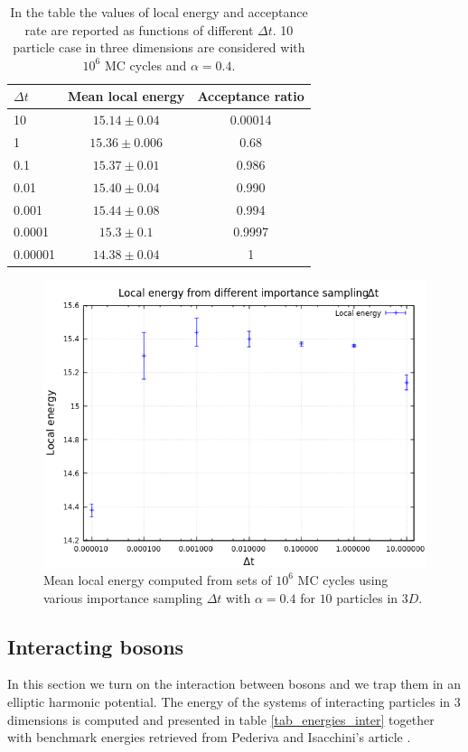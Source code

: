 \begin{table}[H]
\caption{In the table the values of local energy and acceptance rate are reported as functions of different $\Delta t$. 10 particle case in three dimensions are considered with $10^6$ MC cycles and $\alpha =0.4$.}
\centering
\begin{tabular}{l |c |c  } 
\textbf{$\Delta t$}& \textbf{Mean local energy} & \textbf{Acceptance ratio} \\ \hline
10 & $15.14\pm 0.04$   & 0.00014   \\
1 &  $15.36\pm0.006$   & 0.68  \\
0.1 & $15.37\pm0.01$    &  0.986 \\
0.01 & $15.40 \pm0.04 $  &  0.990 \\
0.001 & $15.44\pm0.08$    &  0.994 \\
0.0001 & $15.3\pm0.1$    &  0.9997 \\
0.00001 & $14.38\pm0.04$    &  1 \\
 
\end{tabular}
\label{tab_imp_acc}
\end{table} 


\begin{figure}[H]
\centering
\includegraphics[scale=1]{figures/importance_sampling_dt_new}
\caption{Mean local energy computed from sets of $10^6$ MC cycles using various importance sampling $\Delta t$ with $\alpha = 0.4$ for $10$ particles in $3D$. }
\label{fig_energy_timestep}
\end{figure}

\subsection{Interacting bosons}
In this section we turn on the interaction between bosons and we trap them in an elliptic harmonic potential. The energy of the systems of interacting particles in $3$ dimensions is computed and presented in table \ref{tab_energies_inter} together with benchmark energies retrieved from Pederiva and Isacchini's article \cite{giovanni}. %

